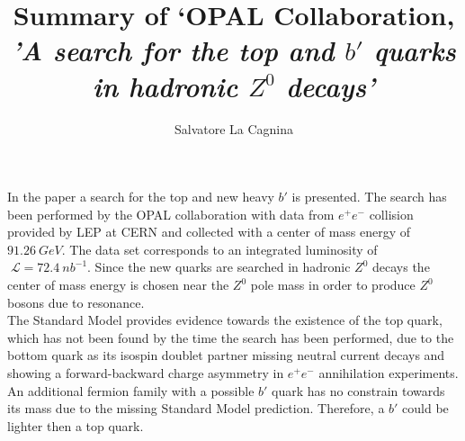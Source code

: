 \documentclass[11pt, twocolumn, a4paper]{article}
\begin{document}
\thispagestyle{empty}

\author{Salvatore La Cagnina}

\title{Summary of `OPAL Collaboration, {\it 'A search for the top and $b'$ quarks in hadronic $Z^0$ decays'}}

\maketitle

In the paper a search for the top and new heavy $b'$ is presented.
The search has been performed by the OPAL collaboration with data from $e^+ e^-$ collision provided by LEP at CERN and collected with a center of mass energy of $\SI{91.26}{GeV}$.
The data set corresponds to an integrated luminosity of ${\;\mathcal{L}=\SI{72.4}{nb^{-1}}}$.
Since the new quarks are searched in hadronic $Z^0$ decays the center of mass energy is chosen near the $Z^0$ pole mass in order to produce $Z^0$ bosons due to resonance.\\
The Standard Model provides evidence towards the existence of the top quark, which has not been found by the time the search has been performed, due to the bottom quark as its isospin doublet partner missing neutral current decays and showing a forward-backward charge asymmetry in $e^+ e^-$ annihilation experiments.
An additional fermion family with a possible $b'$ quark has no constrain towards its mass due to the missing Standard Model prediction.
Therefore, a $b'$ could be lighter then a top quark.
\end{document}
